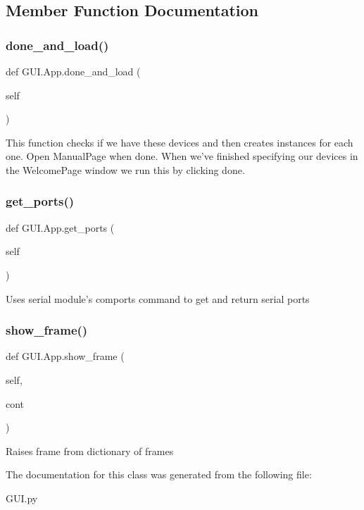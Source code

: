 \subsection{Member Function Documentation}
\mbox{\label{class_g_u_i_1_1_app_aa208ca0794eea3fb8375a4ec249ee41e}} 
\subsubsection{\texorpdfstring{done\_and\_load()}{done\_and\_load()}}
{\footnotesize\ttfamily def G\+U\+I.\+App.\+done\+\_\+and\+\_\+load (\begin{DoxyParamCaption}\item[{}]{self }\end{DoxyParamCaption})}

\begin{DoxyVerb}This function checks if we have these devices and then creates instances for each one. Open ManualPage when done.
When we've finished specifying our devices in the WelcomePage window we run this by clicking done.
\end{DoxyVerb}
 \mbox{\label{class_g_u_i_1_1_app_a87d24261fd2549666a3a2a35bbc593f1}} 
\subsubsection{\texorpdfstring{get\_ports()}{get\_ports()}}
{\footnotesize\ttfamily def G\+U\+I.\+App.\+get\+\_\+ports (\begin{DoxyParamCaption}\item[{}]{self }\end{DoxyParamCaption})}

\begin{DoxyVerb}Uses serial module's comports command to get and return serial ports
\end{DoxyVerb}
 \mbox{\label{class_g_u_i_1_1_app_a6168406499bb44b93e6a7c63a65b2a39}} 
\subsubsection{\texorpdfstring{show\_frame()}{show\_frame()}}
{\footnotesize\ttfamily def G\+U\+I.\+App.\+show\+\_\+frame (\begin{DoxyParamCaption}\item[{}]{self,  }\item[{}]{cont }\end{DoxyParamCaption})}

\begin{DoxyVerb}Raises frame from dictionary of frames
\end{DoxyVerb}
 

The documentation for this class was generated from the following file\+:\begin{DoxyCompactItemize}
\item 
G\+U\+I.\+py\end{DoxyCompactItemize}
